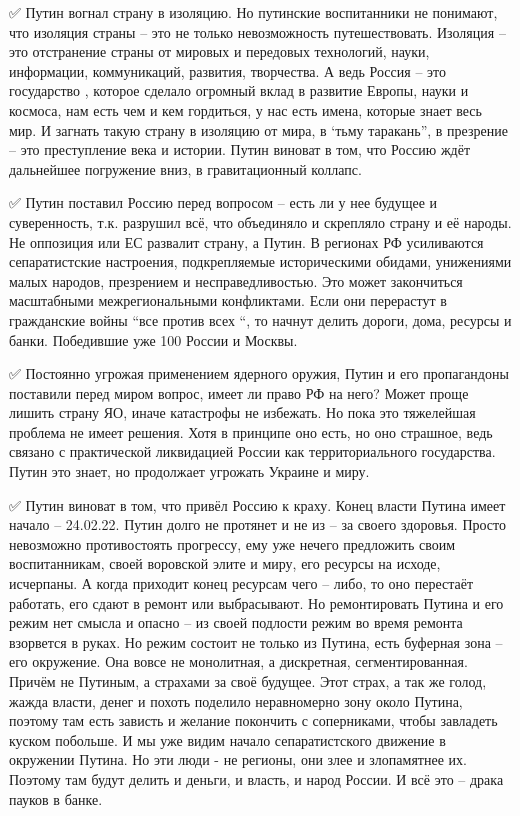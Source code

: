 ✅ Путин вогнал страну в изоляцию. Но путинские воспитанники не понимают, что
изоляция страны – это не только невозможность путешествовать. Изоляция – это
отстранение страны от мировых и передовых технологий, науки, информации,
коммуникаций, развития, творчества. А ведь Россия – это государство , которое
сделало огромный вклад в развитие Европы, науки и космоса, нам есть чем и кем
гордиться, у нас есть имена, которые знает весь мир. И загнать такую страну в
изоляцию от мира, в ‘тьму таракань”, в презрение – это преступление века и
истории. Путин виноват в том, что Россию ждёт дальнейшее погружение вниз, в
гравитационный коллапс.

✅ Путин поставил Россию перед вопросом – есть ли у нее будущее и суверенность,
т.к. разрушил всё, что объединяло и скрепляло страну и её народы. Не оппозиция
или ЕС развалит страну, а Путин. В регионах РФ усиливаются сепаратистские
настроения, подкрепляемые историческими обидами, унижениями малых народов,
презрением и несправедливостью. Это может закончиться масштабными
межрегиональными конфликтами. Если они перерастут в гражданские войны “все
против всех “, то начнут делить дороги, дома, ресурсы и банки. Победившие уже
100%
России и Москвы.

✅ Постоянно угрожая применением ядерного оружия, Путин и его пропагандоны
поставили перед миром вопрос, имеет ли право РФ на него? Может проще лишить
страну ЯО, иначе катастрофы не избежать. Но пока это тяжелейшая проблема не
имеет решения. Хотя в принципе оно есть, но оно страшное, ведь связано с
практической ликвидацией России как территориального государства. Путин это
знает, но продолжает угрожать Украине и миру.

✅ Путин виноват в том, что привёл Россию к краху. Конец власти Путина имеет
начало – 24.02.22. Путин долго не протянет и не из – за своего здоровья. Просто
невозможно противостоять прогрессу, ему уже нечего предложить своим
воспитанникам, своей воровской элите и миру, его ресурсы на исходе, исчерпаны.
А когда приходит конец ресурсам чего – либо, то оно перестаёт работать, его
сдают в ремонт или выбрасывают. Но ремонтировать Путина и его режим нет смысла
и опасно – из своей подлости режим во время ремонта взорвется в руках. Но режим
состоит не только из Путина, есть буферная зона – его окружение. Она вовсе не
монолитная, а дискретная, сегментированная. Причём не Путиным, а страхами за
своё будущее. Этот страх, а так же голод, жажда власти, денег и похоть поделило
неравномерно зону около Путина, поэтому там есть зависть и желание покончить с
соперниками, чтобы завладеть куском побольше. И мы уже видим начало
сепаратистского движение в окружении Путина. Но эти люди - не регионы, они злее
и злопамятнее их. Поэтому там будут делить и деньги, и власть, и народ России.
И всё это – драка пауков в банке.

